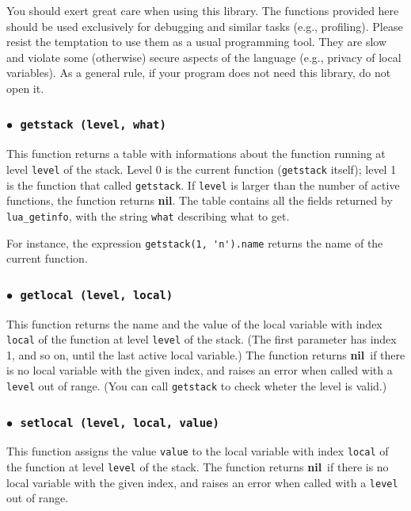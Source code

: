 \documentclass[11pt]{article}
\newcommand{\T}[1]{{\tt #1}}
\newcommand{\nil}{{\bf nil}}
\newcommand{\Deffunc}[1]{\index{#1}}
\newcommand{\ff}{$\bullet$\ }
\begin{document}
You should exert great care when using this library.
The functions provided here should be used exclusively for debugging
and similar tasks (e.g., profiling).
Please resist the temptation to use them as a
usual programming tool.
They are slow and violate some (otherwise) secure aspects of the
language (e.g., privacy of local variables).
As a general rule, if your program does not need this library,
do not open it.


\subsubsection*{\ff \T{getstack (level, what)}}\Deffunc{getstack}

This function returns a table with informations about the function
running at level \verb|level| of the stack.
Level 0 is the current function (\verb|getstack| itself);
level 1 is the function that called \verb|getstack|.
If \verb|level| is larger than the number of active functions,
the function returns \nil.
The table contains all the fields returned by \verb|lua_getinfo|,
with the string \verb|what| describing what to get.

For instance, the expression \verb|getstack(1, 'n').name| returns
the name of the current function.


\subsubsection*{\ff \T{getlocal (level, local)}}\Deffunc{getlocal}

This function returns the name and the value of the local variable
with index \verb|local| of the function at level \verb|level| of the stack.
(The first parameter has index 1, and so on,
until the last active local variable.)
The function returns \nil\ if there is no local
variable with the given index,
and raises an error when called with a \verb|level| out of range.
(You can call \verb|getstack| to check wheter the level is valid.)

\subsubsection*{\ff \T{setlocal (level, local, value)}}\Deffunc{setlocal}

This function assigns the value \verb|value| to the local variable
with index \verb|local| of the function at level \verb|level| of the stack.
The function returns \nil\ if there is no local
variable with the given index,
and raises an error when called with a \verb|level| out of range.
\end{document}
